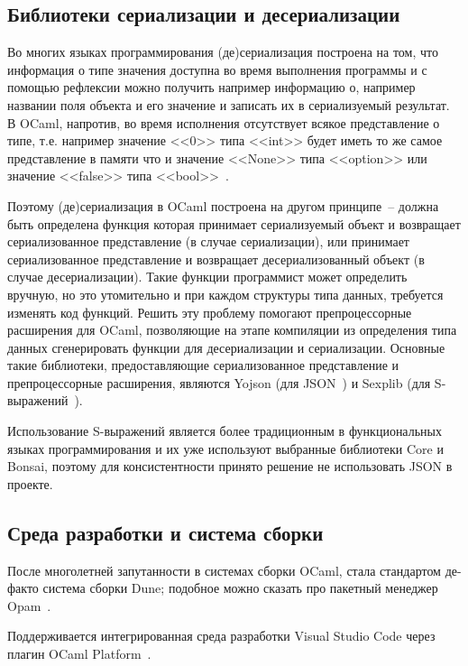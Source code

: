 \subsection{Библиотеки сериализации и десериализации}

Во многих языках программирования (де)сериализация построена на том, что
информация о типе значения доступна во время выполнения программы и с помощью рефлексии можно
получить например информацию о, например названии поля объекта и его значение и записать их в
сериализуемый результат. В OCaml, напротив, во время исполнения отсутствует всякое представление
о типе, т.е. например значение <<0>> типа <<int>> будет иметь то же самое представление в памяти что и
значение <<None>> типа <<option>> или значение <<false>> типа <<bool>>~\cite{rwo-runtime-memory}.

Поэтому (де)сериализация в OCaml построена на другом принципе~-- должна быть определена функция которая
принимает сериализуемый объект и возвращает сериализованное представление (в случае сериализации),
или принимает сериализованное представление и возвращает десериализованный объект (в случае десериализации).
Такие функции программист может определить вручную, но это утомительно и при каждом структуры типа данных,
требуется изменять код функций. Решить эту проблему помогают препроцессорные расширения для OCaml, позволяющие
на этапе компиляции из определения типа данных сгенерировать функции для десериализации и сериализации.
Основные такие библиотеки, предоставляющие сериализованное представление и препроцессорные расширения,
являются Yojson (для JSON~\cite{rwo-json}) и Sexplib (для S-выражений~\cite{rwo-sexp}).

Использование S-выражений является более традиционным в функциональных языках программирования и их
уже используют выбранные библиотеки Core и Bonsai, поэтому для консистентности принято решение
не использовать JSON в проекте.

\subsection{Среда разработки и система сборки}

После многолетней запутанности в системах сборки OCaml, стала стандартом де-факто система сборки Dune;
подобное можно сказать про пакетный менеджер Opam~\cite{anil-gemma-qcon}.

Поддерживается интегрированная среда разработки Visual Studio Code через плагин OCaml Platform~\cite{rwo-platform}.

